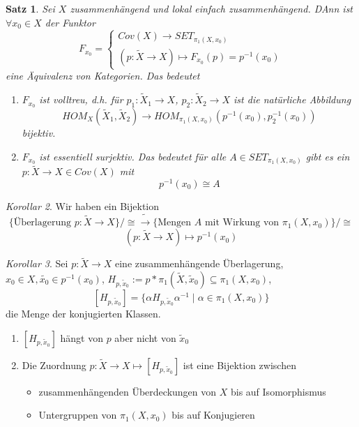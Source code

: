 \documentclass[a4paper, 12pt]{article}
\theoremstyle{plain}
\newtheorem{theorem}{Satz}[section] %
\theoremstyle{definition}
\theoremstyle{lemma}
\theoremstyle{remark}
\theoremstyle{corollary}
\newtheorem{corollary}[theorem]{Korollar}
\theoremstyle{example}
\begin{document}
	\begin{theorem}
		Sei $X$ zusammenhängend und lokal einfach zusammenhängend. DAnn ist $\forall x_0 \in X$ der Funktor \[F_{x_0} = \begin{cases}
			Cov(X) \to SET_{\pi_1(X,x_0)}\\
			(p: \tilde{X} \to X) \mapsto F_{x_0}(p) = p^{-1}(x_0)
		\end{cases}\]
		eine Äquivalenz von Kategorien. Das bedeutet \begin{enumerate}
			\item $F_{x_0}$ ist volltreu, d.h. für $p_1: \tilde{X}_1 \to X$, $p_2: \tilde{X}_2 \to X$ ist die natürliche Abbildung \[HOM_X(\tilde{X}_1, \tilde{X}_2) \to HOM_{\pi_1(X,x_0)}(p^{-1}(x_0),p_2^{-1}(x_0))\] bijektiv.
			\item $F_{x_0}$ ist essentiell surjektiv. Das bedeutet für alle $A \in SET_{\pi_1(X,x_0)}$ gibt es ein $p:\tilde{X} \to X \in Cov(X)$ mit \[p^{-1}(x_0) \cong A\]
		\end{enumerate}
	\end{theorem}
	\begin{corollary}
		Wir haben ein Bijektion \[\{\text{Überlagerung } p: \tilde{X} \to X\} / \cong \tilde{\rightarrow} \{\text{Mengen } A \text{ mit Wirkung von } \pi_1(X,x_0)\} / \cong \]
		\[(p: \tilde{X} \to X) \mapsto p^{-1}(x_0)\]
	\end{corollary}
	\begin{corollary}
		Sei $p: \tilde{X} \to X$ eine zusammenhängende Überlagerung, $x_0 \in X, \tilde{x_0} \in p^{-1}(x_0)$, $H_{p,\tilde{x}_0} := p*\pi_1(\tilde{X}, \tilde{x}_0) \subseteq \pi_1(X,x_0)$, \[[H_{p,\tilde{x}_0}] = \{\alpha H_{p,\tilde{x}_0} \alpha^{-1} \mid \alpha \in \pi_1(X,x_0)\}\] die Menge der konjugierten Klassen.
		\begin{enumerate}
			\item $[H_{p,\tilde{x}_0}]$ hängt von $p$ aber nicht von $\tilde{x}_0$
			\item Die Zuordnung $p:\tilde{X} \to X \mapsto [H_{p,\tilde{x}_0}]$ ist eine Bijektion zwischen \begin{itemize}
				\item zusammenhängenden Überdeckungen von $X$ bis auf Isomorphismus
				\item Untergruppen von $\pi_1(X,x_0)$ bis auf Konjugieren
			\end{itemize}
		\end{enumerate}
	\end{corollary}
\end{document}
